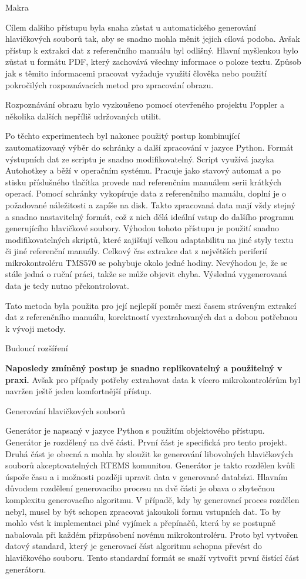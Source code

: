 \secc Makra

	Cílem dalšího přístupu byla snaha zůstat u automatického generování hlavičkových souborů tak, aby se snadno mohla měnit jejich cílová podoba.
Avšak přístup k extrakci dat z referenčního manuálu byl odlišný.
Hlavní myšlenkou bylo zůstat u formátu PDF, který zachovává všechny informace o poloze textu.
Způsob jak s těmito informacemi pracovat vyžaduje využití člověka nebo použití pokročilých rozpoznávacích metod pro zpracování obrazu.

Rozpoznávání obrazu bylo vyzkoušeno pomocí otevřeného projektu Poppler a několika dalších nepříliš udržovaných utilit.


Po těchto experimentech byl nakonec použitý postup kombinující zautomatizovaný výběr do schránky a další zpracování v jazyce Python.
Formát výstupních dat ze scriptu je snadno modifikovatelný.
Script využívá jazyka Autohotkey a běží v operačním systému.
Pracuje jako stavový automat a po stisku příslušného tlačítka provede nad referenčním manuálem serii krátkých operací.
Pomocí schránky vykopíruje data z referenčního manuálu, doplní je o požadované náležitosti a zapíše na disk.
Takto zpracovaná data mají vždy stejný a snadno nastavitelný formát, což z nich dělá ideální vstup do dalšího programu generujícího hlavičkové soubory.
Výhodou tohoto přístupu je použití snadno modifikovatelných skriptů, které zajišťují velkou adaptabilitu na jiné styly textu či jiné referenční manuály.
Celkový čas extrakce dat z největších periferií mikrokontroléru TMS570 se pohybuje okolo jedné hodiny.
Nevýhodou je, že se stále jedná o ruční práci, takže se může objevit chyba.
Výsledná vygenerovaná data je tedy nutno překontrolovat.

Tato metoda byla použita pro její nejlepší poměr mezi časem stráveným extrakcí dat z referenčního manuálu, korektností vyextrahovaných dat a dobou potřebnou k vývoji metody.

\secc Budoucí rozšíření

	{\bf Naposledy zmíněný postup je snadno replikovatelný a použitelný v praxi. }
Avšak pro případy potřeby extrahovat data k vícero mikrokontrolérům byl navržen ještě jeden komfortnější přístup. %

\sec Generování hlavičkových souborů

	Generátor je napsaný v jazyce Python s použitím objektového přístupu.
Generátor je rozdělený na dvě části.
První část je specifická pro tento projekt.
Druhá část je obecná a mohla by sloužit ke generování libovolných hlavičkových souborů akceptovatelných RTEMS komunitou.
Generátor je takto rozdělen kvůli úspoře času a i možnosti později upravit data v generované databázi.
Hlavním důvodem rozdělení generovacího procesu na dvě části je obava o zbytečnou komplexitu generovacího algoritmu.
V případě, kdy by generovací proces rozdělen nebyl, musel by být schopen zpracovat jakoukoli formu vstupních dat.
To by mohlo vést k implementaci plné vyjímek a přepínačů, která by se postupně nabalovala při každém přizpůsobení novému mikrokontroléru.
Proto byl vytvořen datový standard, který je generovací část algoritmu schopna převést do hlavičkového souboru.
Tento standardní formát se snaží vytvořit první čistící část generátoru.

